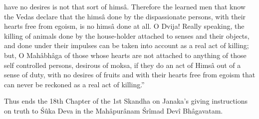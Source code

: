 have no desires is not that sort of hims\^a. Therefore the learned men that know the Vedas declare that the hims\^a done by the dispassionate persons, with their hearts free from egoism, is no hims\^a done at all. O Dvija! Really speaking, the killing of animals done by the house-holder attached to senses and their objects, and done under their impulses can be taken into account as a real act of killing; but, O Mah\^abh\^aga of those whose hearts are not attached to anything of those self controlled persons, desirous of moksa, if they do an act of Hims\^a out of a sense of duty, with no desires of fruits and with their hearts free from egoism that can never be reckoned as a real act of killing.''

Thus ends the 18th Chapter of the 1st Skandha on Janaka's giving instructions on truth to \'S\^uka Deva in the Mah\^apur\^anam \'Sr\^imad Dev\^i Bh\^agavatam.